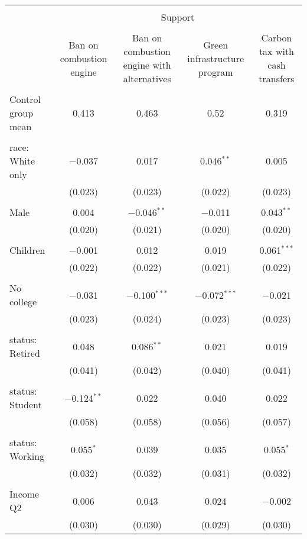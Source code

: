 
\begin{tabular}{@{\extracolsep{5pt}}lcccc} 
\\[-1.8ex]\hline 
\hline \\[-1.8ex] 
 & \multicolumn{4}{c}{Support} \\ 
\cline{2-5} 
\\[-1.8ex] & Ban on combustion engine & Ban on combustion engine with alternatives & Green infrastructure program & Carbon tax with cash transfers \\ 
\hline \\[-1.8ex] 
 Control group mean & 0.413 & 0.463 & 0.52 & 0.319  \\ \hline \\[-1.8ex] race: White only & $-$0.037 & 0.017 & 0.046$^{**}$ & 0.005 \\ 
  & (0.023) & (0.023) & (0.022) & (0.023) \\ 
  & & & & \\ 
 Male & 0.004 & $-$0.046$^{**}$ & $-$0.011 & 0.043$^{**}$ \\ 
  & (0.020) & (0.021) & (0.020) & (0.020) \\ 
  & & & & \\ 
 Children & $-$0.001 & 0.012 & 0.019 & 0.061$^{***}$ \\ 
  & (0.022) & (0.022) & (0.021) & (0.022) \\ 
  & & & & \\ 
 No college & $-$0.031 & $-$0.100$^{***}$ & $-$0.072$^{***}$ & $-$0.021 \\ 
  & (0.023) & (0.024) & (0.023) & (0.023) \\ 
  & & & & \\ 
 status: Retired & 0.048 & 0.086$^{**}$ & 0.021 & 0.019 \\ 
  & (0.041) & (0.042) & (0.040) & (0.041) \\ 
  & & & & \\ 
 status: Student & $-$0.124$^{**}$ & 0.022 & 0.040 & 0.022 \\ 
  & (0.058) & (0.058) & (0.056) & (0.057) \\ 
  & & & & \\ 
 status: Working & 0.055$^{*}$ & 0.039 & 0.035 & 0.055$^{*}$ \\ 
  & (0.032) & (0.032) & (0.031) & (0.032) \\ 
  & & & & \\ 
 Income Q2 & 0.006 & 0.043 & 0.024 & $-$0.002 \\ 
  & (0.030) & (0.030) & (0.029) & (0.030) \\ 

\end{tabular}
